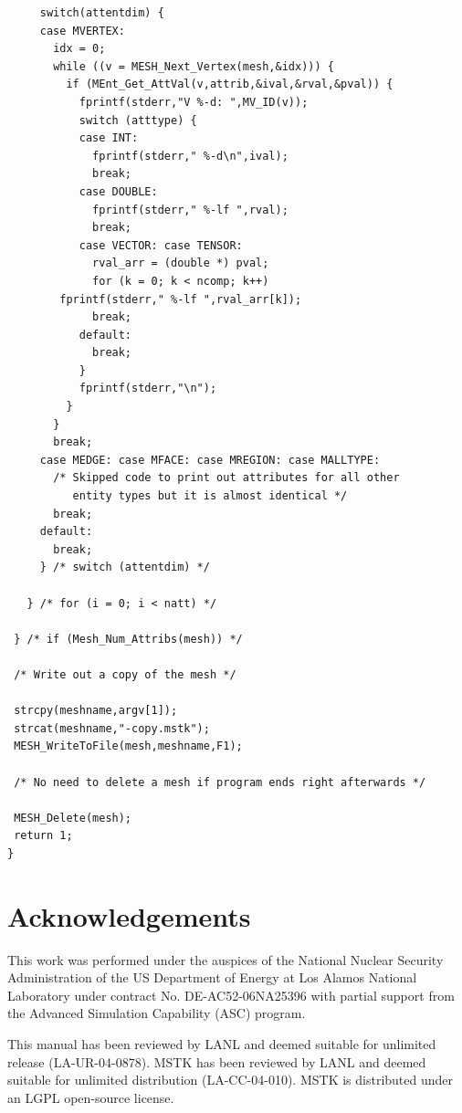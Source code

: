 \documentclass[12pt]{article}
\begin{document}
\begin{verbatim}
     switch(attentdim) {
     case MVERTEX:
       idx = 0;
       while ((v = MESH_Next_Vertex(mesh,&idx))) {
         if (MEnt_Get_AttVal(v,attrib,&ival,&rval,&pval)) {
           fprintf(stderr,"V %-d: ",MV_ID(v));
           switch (atttype) {
           case INT:
             fprintf(stderr," %-d\n",ival);
             break;
           case DOUBLE: 
             fprintf(stderr," %-lf ",rval);
             break;
           case VECTOR: case TENSOR:
             rval_arr = (double *) pval;
             for (k = 0; k < ncomp; k++)
       	fprintf(stderr," %-lf ",rval_arr[k]);
             break;
           default:
             break;
           }
           fprintf(stderr,"\n");
         }
       }
       break;
     case MEDGE: case MFACE: case MREGION: case MALLTYPE:
       /* Skipped code to print out attributes for all other
          entity types but it is almost identical */
       break;	
     default:
       break;
     } /* switch (attentdim) */

   } /* for (i = 0; i < natt) */
   
 } /* if (Mesh_Num_Attribs(mesh)) */
  
 /* Write out a copy of the mesh */

 strcpy(meshname,argv[1]);
 strcat(meshname,"-copy.mstk");
 MESH_WriteToFile(mesh,meshname,F1);

 /* No need to delete a mesh if program ends right afterwards */

 MESH_Delete(mesh);
 return 1;
}
\end{verbatim}

\section{Acknowledgements}

This work was performed under the auspices of the National Nuclear
Security Administration of the US Department of Energy at Los Alamos
National Laboratory under contract No. DE-AC52-06NA25396 with partial support
from the Advanced Simulation Capability (ASC) program.

This manual has been reviewed by LANL and deemed suitable for unlimited
release (LA-UR-04-0878). MSTK has been reviewed by LANL and deemed suitable
for unlimited distribution (LA-CC-04-010). MSTK is distributed under
an LGPL open-source license.
\end{document}
